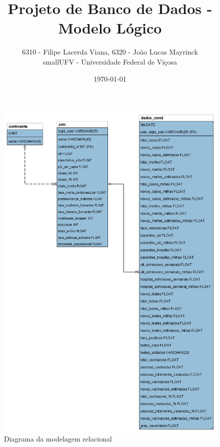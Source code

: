 \documentclass{article}
\title{Projeto de Banco de Dados - Modelo Lógico}
\author{6310 - Filipe Lacerda Viana, 6320 - João Lucas Mayrinck\\small{UFV - Universidade Federal de Viçosa}}
\date{\today}
\begin{document}
    \maketitle

    \begin{figure}
        
        \centering
        \includegraphics[scale=0.45]{MLR-semFundo.png}
        \caption{Diagrama da modelagem relacional}

    \end{figure}
    
\end{document}
